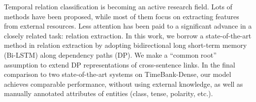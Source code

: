 Temporal relation classification is becoming an active research field. Lots of methods have been proposed, while most of them focus on extracting features from external resources. Less attention has been paid to a significant advance in a closely related task: relation extraction. In this work, we borrow a state-of-the-art method in relation extraction by adopting bidirectional long short-term memory (Bi-LSTM) along dependency paths (DP). We make a ``common root'' assumption to extend DP representations of cross-sentence links. In the final comparison to two state-of-the-art systems on TimeBank-Dense, our model achieves comparable performance, without using external knowledge, as well as manually annotated attributes of entities (class, tense, polarity, etc.).
